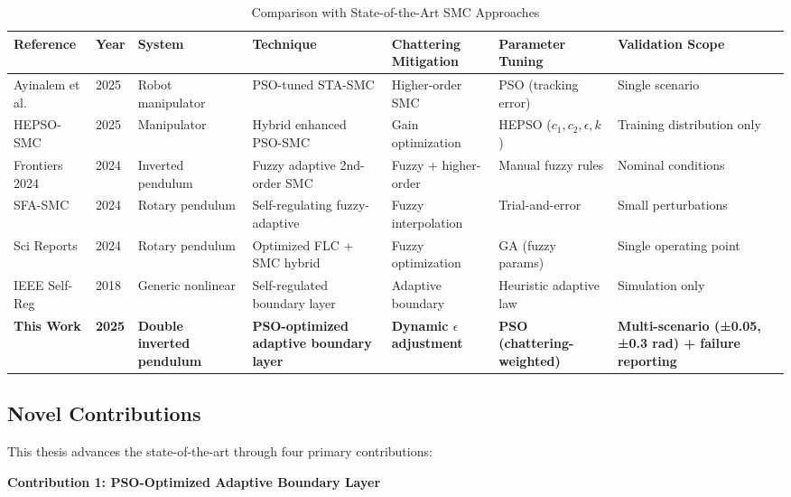 \begin{table}[t]
\centering
\caption{Comparison with State-of-the-Art SMC Approaches}
\label{tab:sota_comparison}
\footnotesize
\begin{tabular}{p{2.2cm}p{0.6cm}p{1.8cm}p{2cm}p{1.8cm}p{1.8cm}p{2cm}}
\toprule
\textbf{Reference} & \textbf{Year} & \textbf{System} & \textbf{Technique} & \textbf{Chattering Mitigation} & \textbf{Parameter Tuning} & \textbf{Validation Scope} \\
\midrule
Ayinalem et al. \cite{ayinalem2025pso} & 2025 & Robot manipulator & PSO-tuned STA-SMC & Higher-order SMC & PSO (tracking error) & Single scenario \\
HEPSO-SMC \cite{hepso2025manipulator} & 2025 & Manipulator & Hybrid enhanced PSO-SMC & Gain optimization & HEPSO ($c_1, c_2, \epsilon, k$) & Training distribution only \\
Frontiers 2024 \cite{frontiers2024fuzzy} & 2024 & Inverted pendulum & Fuzzy adaptive 2nd-order SMC & Fuzzy + higher-order & Manual fuzzy rules & Nominal conditions \\
SFA-SMC \cite{sfa2024rotary} & 2024 & Rotary pendulum & Self-regulating fuzzy-adaptive & Fuzzy interpolation & Trial-and-error & Small perturbations \\
Sci Reports \cite{scirep2024fuzzy} & 2024 & Rotary pendulum & Optimized FLC + SMC hybrid & Fuzzy optimization & GA (fuzzy params) & Single operating point \\
IEEE Self-Reg \cite{ieee2018selfreg} & 2018 & Generic nonlinear & Self-regulated boundary layer & Adaptive boundary & Heuristic adaptive law & Simulation only \\
\midrule
\textbf{This Work} & \textbf{2025} & \textbf{Double inverted pendulum} & \textbf{PSO-optimized adaptive boundary layer} & \textbf{Dynamic $\epsilon$ adjustment} & \textbf{PSO (chattering-weighted)} & \textbf{Multi-scenario (±0.05, ±0.3 rad) + failure reporting} \\
\bottomrule
\end{tabular}
\end{table}

\subsection{Novel Contributions}

This thesis advances the state-of-the-art through four primary contributions:

\textbf{Contribution 1: PSO-Optimized Adaptive Boundary Layer}

